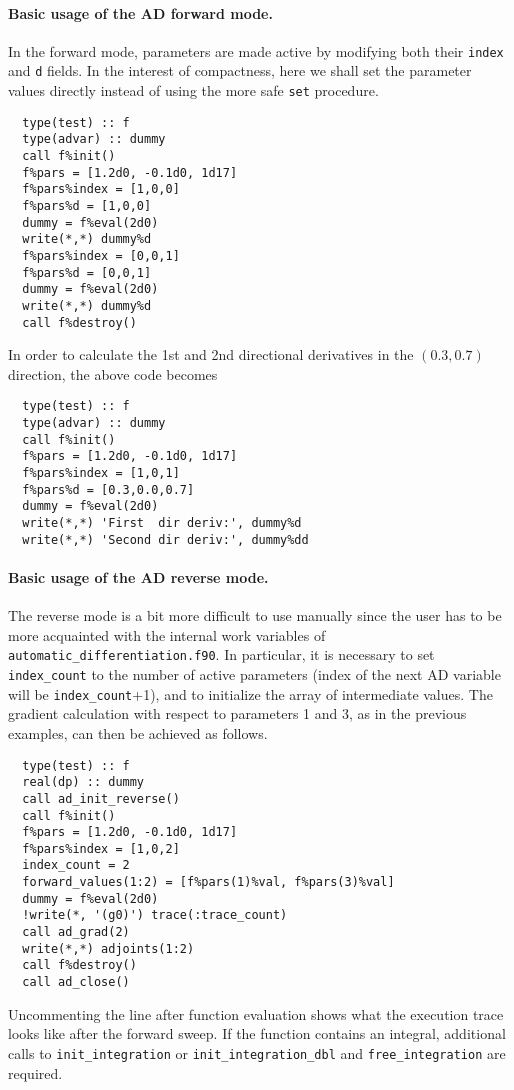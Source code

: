\documentclass{article}
\begin{document}
\paragraph{Basic usage of the AD forward mode.} In the forward mode, parameters are made active by modifying both their \texttt{index} and \texttt{d} fields. In the interest of compactness, here we shall set the parameter values directly instead of using the more safe \texttt{set} procedure.
\begin{verbatim}
  type(test) :: f
  type(advar) :: dummy
  call f%init()
  f%pars = [1.2d0, -0.1d0, 1d17]
  f%pars%index = [1,0,0]
  f%pars%d = [1,0,0]
  dummy = f%eval(2d0)
  write(*,*) dummy%d
  f%pars%index = [0,0,1]
  f%pars%d = [0,0,1]
  dummy = f%eval(2d0)
  write(*,*) dummy%d
  call f%destroy()
\end{verbatim}
In order to calculate the 1st and 2nd directional derivatives in the $(0.3,0.7)$ direction, the above code becomes
\begin{verbatim}
  type(test) :: f
  type(advar) :: dummy
  call f%init()
  f%pars = [1.2d0, -0.1d0, 1d17]
  f%pars%index = [1,0,1]
  f%pars%d = [0.3,0.0,0.7]
  dummy = f%eval(2d0)
  write(*,*) 'First  dir deriv:', dummy%d
  write(*,*) 'Second dir deriv:', dummy%dd
\end{verbatim}

\paragraph{Basic usage of the AD reverse mode.} The reverse mode is a bit more difficult to use manually since the user has to be more acquainted with the internal work variables of \verb+automatic_differentiation.f90+. In particular, it is necessary to set \verb+index_count+ to the number of active parameters (index of the next AD variable will be \verb+index_count++1), and to initialize the array of intermediate values. The gradient calculation with respect to parameters 1 and 3, as in the previous examples, can then be achieved as follows.
\begin{verbatim}
  type(test) :: f
  real(dp) :: dummy
  call ad_init_reverse()
  call f%init()
  f%pars = [1.2d0, -0.1d0, 1d17]
  f%pars%index = [1,0,2]
  index_count = 2
  forward_values(1:2) = [f%pars(1)%val, f%pars(3)%val]
  dummy = f%eval(2d0)
  !write(*, '(g0)') trace(:trace_count)
  call ad_grad(2)
  write(*,*) adjoints(1:2)
  call f%destroy()
  call ad_close()
\end{verbatim}
Uncommenting the line after function evaluation shows what the execution trace looks like after the forward sweep. If the function contains an integral, additional calls to \verb+init_integration+ or \verb+init_integration_dbl+ and \verb+free_integration+ are required.
\end{document}
